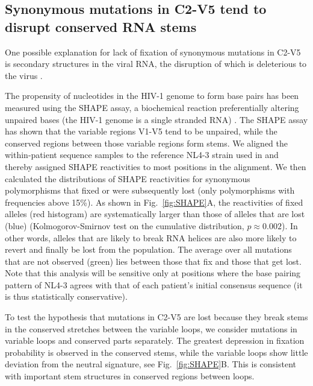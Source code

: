 \documentclass[10pt]{article}
\newcommand{\FIG}[1]{Fig.~\ref{fig:#1}}
\newcommand{\shankaregion}{C2-V5}
\begin{document}
\subsection*{Synonymous mutations in \shankaregion{} tend to disrupt conserved RNA stems}
One possible explanation for lack of fixation of synonymous mutations in
\shankaregion{} is secondary structures in the viral RNA, the disruption of which
is deleterious to the virus \cite{forsdyke_reciprocal_1995,
snoeck_mapping_2011, sanjuan_interplay_2011}.

The propensity of nucleotides in the HIV-1 genome to form base pairs has been
measured using the SHAPE assay, a biochemical reaction preferentially altering
unpaired bases (the HIV-1 genome is a single stranded RNA)
\cite{watts_architecture_2009}. The SHAPE assay has shown that the variable
regions V1-V5 tend to be unpaired, while the conserved regions between those
variable regions form stems.  We aligned the within-patient sequence samples 
to the reference NL4-3 strain used in \cite{watts_architecture_2009} and 
thereby assigned SHAPE reactivities to most positions in the alignment. 
We then calculated the distributions of SHAPE reactivities for synonymous 
polymorphisms that fixed or were subsequently lost (only polymorphisms with 
frequencies above 15\%).
As shown in \FIG{SHAPE}A, the reactivities of fixed alleles (red
histogram) are systematically larger than those of alleles that are lost (blue)
(Kolmogorov-Smirnov test on the cumulative distribution, $p\approx 0.002$). In
other words, alleles that are likely to break RNA helices are also more likely
to revert and finally be lost from the population. The average over all
mutations that are not observed (green) lies between  those that fix and
those that get lost. Note that this analysis will be sensitive only at positions
where the base pairing pattern of NL4-3 agrees with that of each patient's
initial consensus sequence (it is thus statistically conservative).

To test the hypothesis that mutations in \shankaregion{} are lost because they
break stems in the conserved stretches between the variable loops, we consider
mutations in variable loops and conserved parts separately. The greatest
depression in fixation probability is observed in the conserved stems, while the
variable loops show little deviation from the neutral signature, see
\FIG{SHAPE}B. This is consistent with important stem structures in conserved
regions between loops.
\end{document}
